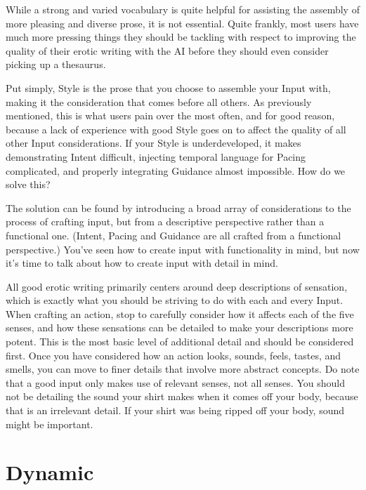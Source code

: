 \documentclass[Source-main.tex]{subfiles}
\begin{document}
While a strong and varied vocabulary is quite helpful for assisting the assembly of more pleasing and diverse prose, it is not essential.
Quite frankly, most users have much more pressing things they should be tackling with respect to improving the quality of their erotic writing with the AI before they should even consider picking up a thesaurus.

Put simply, Style is the prose that you choose to assemble your Input with, making it the consideration that comes before all others.
As previously mentioned, this is what users pain over the most often, and for good reason, because a lack of experience with good Style goes on to affect the quality of all other Input considerations.
If your Style is underdeveloped, it makes demonstrating Intent difficult, injecting temporal language for Pacing complicated, and properly integrating Guidance almost impossible.
How do we solve this?

The solution can be found by introducing a broad array of considerations to the process of crafting input, but from a descriptive perspective rather than a functional one.
(Intent, Pacing and Guidance are all crafted from a functional perspective.)
You’ve seen how to create input with functionality in mind, but now it’s time to talk about how to create input with detail in mind.

All good erotic writing primarily centers around deep descriptions of sensation, which is exactly what you should be striving to do with each and every Input.
When crafting an action, stop to carefully consider how it affects each of the five senses, and how these sensations can be detailed to make your descriptions more potent.
This is the most basic level of additional detail and should be considered first.
Once you have considered how an action looks, sounds, feels, tastes, and smells, you can move to finer details that involve more abstract concepts.
Do note that a good input only makes use of relevant senses, not all senses.
You should not be detailing the sound your shirt makes when it comes off your body, because that is an irrelevant detail.
If your shirt was being ripped off your body, sound might be important.

\section{Dynamic}
\end{document}
